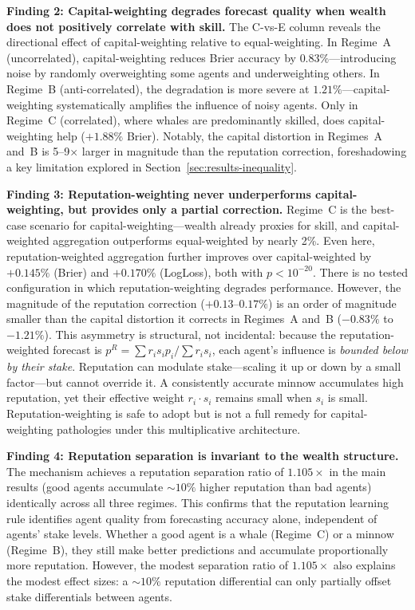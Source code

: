 \documentclass[conference]{IEEEtran}
\begin{document}
\smallskip\noindent\textbf{Finding 2: Capital-weighting degrades forecast quality when wealth does not positively correlate with skill.} The C-vs-E column reveals the directional effect of capital-weighting relative to equal-weighting. In Regime~A (uncorrelated), capital-weighting reduces Brier accuracy by $0.83\%$---introducing noise by randomly overweighting some agents and underweighting others. In Regime~B (anti-correlated), the degradation is more severe at $1.21\%$---capital-weighting systematically amplifies the influence of noisy agents. Only in Regime~C (correlated), where whales are predominantly skilled, does capital-weighting help ($+1.88\%$ Brier). Notably, the capital distortion in Regimes~A and~B is 5--9$\times$ larger in magnitude than the reputation correction, foreshadowing a key limitation explored in Section~\ref{sec:results-inequality}.

\smallskip\noindent\textbf{Finding 3: Reputation-weighting never underperforms capital-weighting, but provides only a partial correction.} Regime~C is the best-case scenario for capital-weighting---wealth already proxies for skill, and capital-weighted aggregation outperforms equal-weighted by nearly 2\%. Even here, reputation-weighted aggregation further improves over capital-weighted by $+0.145\%$ (Brier) and $+0.170\%$ (LogLoss), both with $p < 10^{-20}$. There is no tested configuration in which reputation-weighting degrades performance. However, the magnitude of the reputation correction ($+0.13$--$0.17\%$) is an order of magnitude smaller than the capital distortion it corrects in Regimes~A and~B ($-0.83\%$ to $-1.21\%$). This asymmetry is structural, not incidental: because the reputation-weighted forecast is $p^R = \sum r_i s_i p_i / \sum r_i s_i$, each agent's influence is \emph{bounded below by their stake}. Reputation can modulate stake---scaling it up or down by a small factor---but cannot override it. A consistently accurate minnow accumulates high reputation, yet their effective weight $r_i \cdot s_i$ remains small when $s_i$ is small. Reputation-weighting is safe to adopt but is not a full remedy for capital-weighting pathologies under this multiplicative architecture.

\smallskip\noindent\textbf{Finding 4: Reputation separation is invariant to the wealth structure.} The mechanism achieves a reputation separation ratio of $1.105\times$ in the main results (good agents accumulate ${\sim}10\%$ higher reputation than bad agents) identically across all three regimes. This confirms that the reputation learning rule identifies agent quality from forecasting accuracy alone, independent of agents' stake levels. Whether a good agent is a whale (Regime~C) or a minnow (Regime~B), they still make better predictions and accumulate proportionally more reputation. However, the modest separation ratio of $1.105\times$ also explains the modest effect sizes: a ${\sim}10\%$ reputation differential can only partially offset stake differentials between agents.
\end{document}
